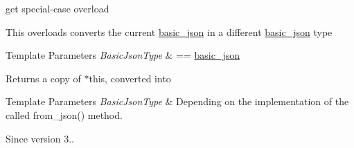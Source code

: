 get special-\/case overload 

This overloads converts the current \mbox{\hyperlink{classnlohmann_1_1basic__json}{basic\+\_\+json}} in a different \mbox{\hyperlink{classnlohmann_1_1basic__json}{basic\+\_\+json}} type


\begin{DoxyTemplParams}{Template Parameters}
{\em Basic\+Json\+Type} & == \mbox{\hyperlink{classnlohmann_1_1basic__json}{basic\+\_\+json}}\\
\hline
\end{DoxyTemplParams}
\begin{DoxyReturn}{Returns}
a copy of $\ast$this, converted into 
\end{DoxyReturn}

\begin{DoxyTemplParams}{Template Parameters}
{\em Basic\+Json\+Type} & Depending on the implementation of the called {\ttfamily from\+\_\+json()} method.\\
\hline
\end{DoxyTemplParams}
\begin{DoxySince}{Since}
version 3.. 
\end{DoxySince}
\mbox{\label{classnlohmann_1_1basic__json_a16f9445f7629f634221a42b967cdcd43}} 
